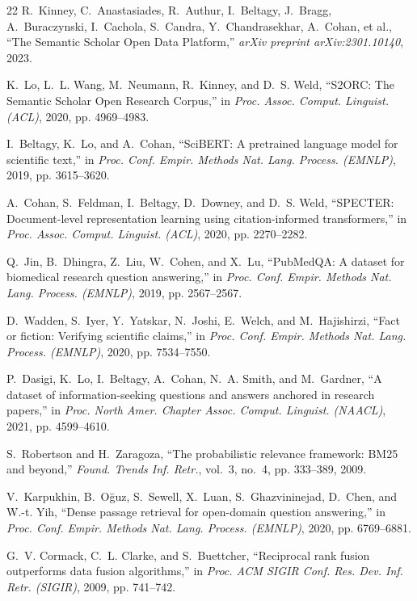 \documentclass[conference]{IEEEtran}
\begin{document}
\begin{thebibliography}{22}
R.~Kinney, C.~Anastasiades, R.~Authur, I.~Beltagy, J.~Bragg, A.~Buraczynski, I.~Cachola, S.~Candra, Y.~Chandrasekhar, A.~Cohan, et al.,
``The Semantic Scholar Open Data Platform,''
\emph{arXiv preprint arXiv:2301.10140}, 2023.

K.~Lo, L.~L. Wang, M.~Neumann, R.~Kinney, and D.~S. Weld,
``S2ORC: The Semantic Scholar Open Research Corpus,''
in \emph{Proc. Assoc. Comput. Linguist. (ACL)}, 2020, pp. 4969--4983.

I.~Beltagy, K.~Lo, and A.~Cohan,
``SciBERT: A pretrained language model for scientific text,''
in \emph{Proc. Conf. Empir. Methods Nat. Lang. Process. (EMNLP)}, 2019, pp. 3615--3620.

A.~Cohan, S.~Feldman, I.~Beltagy, D.~Downey, and D.~S. Weld,
``SPECTER: Document-level representation learning using citation-informed transformers,''
in \emph{Proc. Assoc. Comput. Linguist. (ACL)}, 2020, pp. 2270--2282.

Q.~Jin, B.~Dhingra, Z.~Liu, W.~Cohen, and X.~Lu,
``PubMedQA: A dataset for biomedical research question answering,''
in \emph{Proc. Conf. Empir. Methods Nat. Lang. Process. (EMNLP)}, 2019, pp. 2567--2567.

D.~Wadden, S.~Iyer, Y.~Yatskar, N.~Joshi, E.~Welch, and M.~Hajishirzi,
``Fact or fiction: Verifying scientific claims,''
in \emph{Proc. Conf. Empir. Methods Nat. Lang. Process. (EMNLP)}, 2020, pp. 7534--7550.

P.~Dasigi, K.~Lo, I.~Beltagy, A.~Cohan, N.~A. Smith, and M.~Gardner,
``A dataset of information-seeking questions and answers anchored in research papers,''
in \emph{Proc. North Amer. Chapter Assoc. Comput. Linguist. (NAACL)}, 2021, pp. 4599--4610.

S.~Robertson and H.~Zaragoza,
``The probabilistic relevance framework: BM25 and beyond,''
\emph{Found. Trends Inf. Retr.}, vol.~3, no.~4, pp. 333--389, 2009.

V.~Karpukhin, B.~O\u{g}uz, S.~Sewell, X.~Luan, S.~Ghazvininejad, D.~Chen, and W.-t. Yih,
``Dense passage retrieval for open-domain question answering,''
in \emph{Proc. Conf. Empir. Methods Nat. Lang. Process. (EMNLP)}, 2020, pp. 6769--6881.

G.~V. Cormack, C.~L. Clarke, and S.~Buettcher,
``Reciprocal rank fusion outperforms data fusion algorithms,''
in \emph{Proc. ACM SIGIR Conf. Res. Dev. Inf. Retr. (SIGIR)}, 2009, pp. 741--742.


\end{thebibliography}
\end{document}
